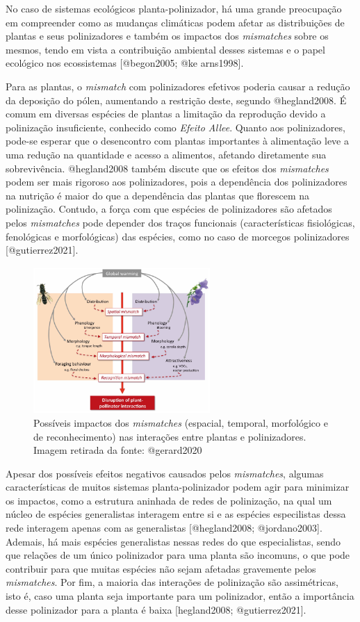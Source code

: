 \documentclass[
  11pt,
]{article}
\begin{document}
No caso de sistemas ecológicos planta-polinizador, há uma grande
preocupação em compreender como as mudanças climáticas podem afetar as
distribuições de plantas e seus polinizadores e também os impactos dos
\emph{mismatches} sobre os mesmos, tendo em vista a contribuição
ambiental desses sistemas e o papel ecológico nos ecossistemas
{[}@begon2005; @ke arns1998{]}.

Para as plantas, o \emph{mismatch} com polinizadores efetivos poderia
causar a redução da deposição do pólen, aumentando a restrição deste,
segundo @hegland2008. É comum em diversas espécies de plantas a
limitação da reprodução devido a polinização insuficiente, conhecido
como \emph{Efeito Allee}. Quanto aos polinizadores, pode-se esperar que
o desencontro com plantas importantes à alimentação leve a uma redução
na quantidade e acesso a alimentos, afetando diretamente sua
sobrevivência. @hegland2008 também discute que os efeitos dos
\emph{mismatches} podem ser mais rigoroso aos polinizadores, pois a
dependência dos polinizadores na nutrição é maior do que a dependência
das plantas que florescem na polinização. Contudo, a força com que
espécies de polinizadores são afetados pelos \emph{mismatches} pode
depender dos traços funcionais (características fisiológicas,
fenológicas e morfológicas) das espécies, como no caso de morcegos
polinizadores {[}@gutierrez2021{]}.

\begin{figure}
\centering
\includegraphics[width=0.6\textwidth,height=\textheight]{mismatch.png}
\caption{Possíveis impactos dos \emph{mismatches} (espacial, temporal,
morfológico e de reconhecimento) nas interações entre plantas e
polinizadores. Imagem retirada da fonte: @gerard2020}
\end{figure}

Apesar dos possíveis efeitos negativos causados pelos \emph{mismatches},
algumas características de muitos sistemas planta-polinizador podem agir
para minimizar os impactos, como a estrutura aninhada de redes de
polinização, na qual um núcleo de espécies generalistas interagem entre
si e as espécies especilistas dessa rede interagem apenas com as
generalistas {[}@hegland2008; @jordano2003{]}. Ademais, há mais espécies
generalistas nessas redes do que especialistas, sendo que relações de um
único polinizador para uma planta são incomuns, o que pode contribuir
para que muitas espécies não sejam afetadas gravemente pelos
\emph{mismatches}. Por fim, a maioria das interações de polinização são
assimétricas, isto é, caso uma planta seja importante para um
polinizador, então a importância desse polinizador para a planta é baixa
{[}hegland2008; @gutierrez2021{]}.
\end{document}
